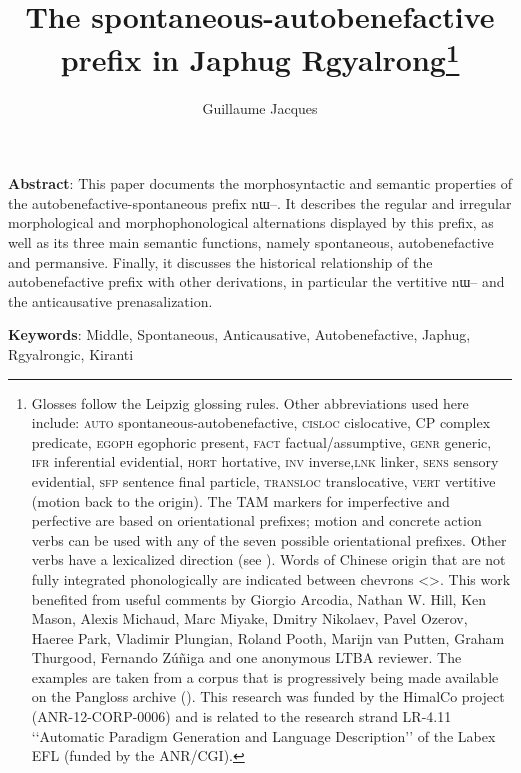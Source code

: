 \documentclass[oldfontcommands,oneside,a4paper,11pt]{article}
\newcommand{\ipa}[1]{{\phon \mbox{#1}}} %
\begin{document}
 
 \title{The spontaneous-autobenefactive prefix in Japhug Rgyalrong\footnote{Glosses follow the Leipzig glossing rules. Other abbreviations used here include: \textsc{auto} spontaneous-autobenefactive, \textsc{cisloc} cislocative, CP complex predicate, \textsc{egoph} egophoric present,  \textsc{fact} factual/assumptive, \textsc{genr} generic, \textsc{ifr} inferential evidential, \textsc{hort} hortative, \textsc{inv} inverse,\textsc{lnk} linker, \textsc{sens} sensory  evidential, \textsc{sfp} sentence final particle, \textsc{transloc} translocative, \textsc{vert} vertitive (motion back to the origin). The TAM markers for imperfective and perfective are based on orientational prefixes; motion and concrete action verbs can be used with any of the seven possible orientational prefixes. Other verbs have a lexicalized direction (see \citealt[266-270]{jacques14linking}).  Words of Chinese origin that are not fully integrated phonologically are indicated between chevrons <>.   This work benefited from useful comments by Giorgio  Arcodia, Nathan W. Hill, Ken Mason, Alexis Michaud, Marc Miyake, Dmitry Nikolaev, Pavel Ozerov, Haeree Park, Vladimir Plungian, Roland Pooth, Marijn van Putten, Graham Thurgood, Fernando Zúñiga and one anonymous LTBA reviewer. The examples are taken from a corpus that is progressively being made available on the Pangloss archive (\citealt{michailovsky14pangloss}). This research was funded by the HimalCo project (ANR-12-CORP-0006) and is related to the research strand LR-4.11 ‘‘Automatic Paradigm Generation and Language Description’’ of the Labex EFL (funded by the ANR/CGI).  }}
\author{Guillaume Jacques}
\maketitle
\sloppy

\textbf{Abstract}: This paper documents the morphosyntactic and semantic properties of the autobenefactive-spontaneous prefix \ipa{nɯ--}. It describes the regular and irregular morphological and morphophonological alternations displayed by this prefix, as well as its three main semantic functions, namely spontaneous, autobenefactive and permansive. Finally, it discusses the historical relationship of the autobenefactive prefix with other derivations, in particular the vertitive \ipa{nɯ--} and the anticausative prenasalization.

\textbf{Keywords}: Middle, Spontaneous, Anticausative, Autobenefactive, Japhug, Rgyalrongic, Kiranti
\end{document}
